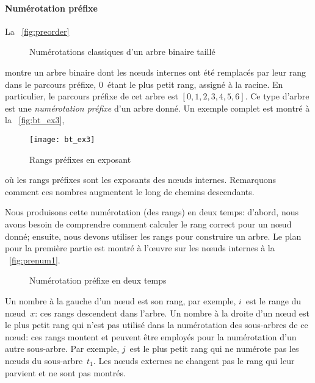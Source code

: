 \paragraph{Numérotation préfixe}

La \fig~\vref{fig:preorder}
\begin{figure}
\centering
{}
\;
\;
\;
\caption{Numérotations classiques d'un arbre binaire taillé}
\label{fig:orders}
\end{figure}
montre un arbre binaire dont les nœuds internes ont été remplacés
par leur rang dans le parcours préfixe, \(0\)~étant le plus petit
rang, assigné à la racine. En particulier, le parcours préfixe de cet
arbre est \([0,1,2,3,4,5,6]\). Ce type d'arbre est une
\emph{numérotation préfixe}
d'un arbre donné. Un exemple complet est montré à la
\fig~\vref{fig:bt_ex3},
\begin{figure}[b]
\centering
\texttt{[image: bt\_ex3]}
\caption{Rangs préfixes en exposant}
\label{fig:bt_ex3}
\end{figure}
où les rangs préfixes sont les exposants des nœuds
internes. Remarquons comment ces nombres augmentent le long de chemins
descendants.

Nous produisons cette numérotation (des rangs) en deux temps: d'abord,
nous avons besoin de comprendre comment calculer le rang correct pour
un nœud donné; ensuite, nous devons utiliser les rangs pour
construire un arbre. Le plan pour la première partie est montré à
l'œuvre sur les nœuds internes à la \fig~\vref{fig:prenum1}.
\begin{figure}[t]
\centering
{}
\qquad
{}
\caption{Numérotation préfixe en deux temps}
\label{fig:prenum}
\end{figure}
Un nombre à la gauche d'un nœud est son rang, par exemple,
\(i\)~est le range du nœud~\(x\): ces rangs descendent dans
l'arbre. Un nombre à la droite d'un nœud est le plus petit rang
qui n'est pas utilisé dans la numérotation des sous-arbres de ce
nœud: ces rangs montent et peuvent être employés pour la
numérotation d'un autre sous-arbre. Par exemple, \(j\)~est le plus
petit rang qui ne numérote pas les nœuds du
sous-arbre~\(t_1\). Les nœuds externes ne changent pas le rang qui
leur parvient et ne sont pas montrés.

